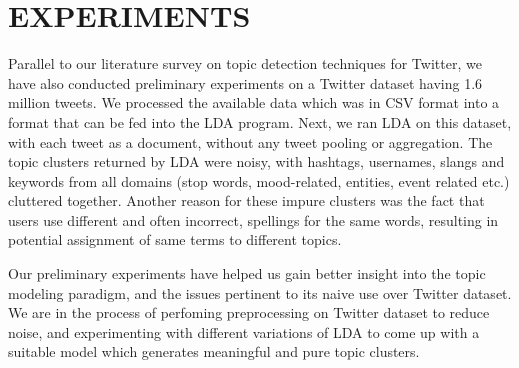 \section{\uppercase{Experiments}}
Parallel to our literature survey on topic detection techniques for Twitter, we have also conducted preliminary experiments on a Twitter dataset having 1.6 million tweets. We processed the available data which was in CSV format into a format that can be fed into the LDA program. Next, we ran LDA on this dataset, with each tweet as a document, without any tweet pooling or aggregation. The topic clusters returned by LDA were noisy, with hashtags, usernames, slangs and keywords from all domains (stop words, mood-related, entities, event related etc.) cluttered together. Another reason for these impure clusters was the fact that users use different and often incorrect, spellings for the same words, resulting in potential assignment of same terms to different topics.

Our preliminary experiments have helped us gain better insight into the topic modeling paradigm, and the issues pertinent to its naive use over Twitter dataset. We are in the process of perfoming preprocessing on Twitter dataset to reduce noise, and experimenting with different variations of LDA to come up with a suitable model which generates meaningful and pure topic clusters.
